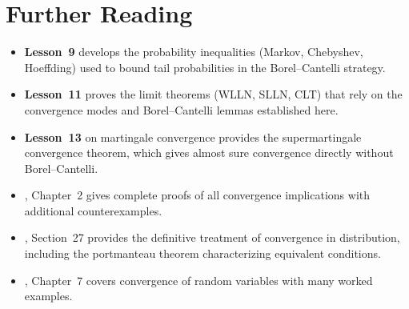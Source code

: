 \documentclass[11pt,a4paper]{article}
\begin{document}
\section{Further Reading}
\label{sec:further_reading}

\begin{itemize}[nosep]
  \item \textbf{Lesson~9} develops the probability inequalities
    (Markov, Chebyshev, Hoeffding) used to bound tail
    probabilities in the Borel--Cantelli strategy.
  \item \textbf{Lesson~11} proves the limit theorems (WLLN, SLLN,
    CLT) that rely on the convergence modes and Borel--Cantelli
    lemmas established here.
  \item \textbf{Lesson~13} on martingale convergence provides the
    supermartingale convergence theorem, which gives almost sure
    convergence directly without Borel--Cantelli.
  \item \citet{durrett2019}, Chapter~2 gives complete proofs of all
    convergence implications with additional counterexamples.
  \item \citet{billingsley1995}, Section~27 provides the definitive
    treatment of convergence in distribution, including the
    portmanteau theorem characterizing equivalent conditions.
  \item \citet{grimmett2001}, Chapter~7 covers convergence of
    random variables with many worked examples.
\end{itemize}


\end{document}
